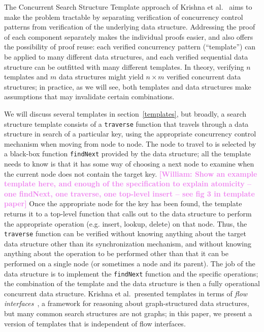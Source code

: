 \documentclass[a4paper,UKenglish,cleveref, autoref, thm-restate]{lipics-v2021}
\newcommand{\wm}[1]{\textbf{\textcolor{violet}{[William: #1]}}}
\begin{document}
The Concurrent Search Structure Template approach of Krishna et al.~\cite{templates} aims to make the problem tractable by separating verification of concurrency control patterns from verification of the underlying data structure. Addressing the proof of each component separately makes the individual proofs easier, and also offers the possibility of proof reuse: each verified concurrency pattern (``template'') can be applied to many different data structures, and each verified sequential data structure can be outfitted with many different templates. In theory, verifying $n$ templates and $m$ data structures might yield $n \times m$ verified concurrent data structures; in practice, as we will see, both templates and data structures make assumptions that may invalidate certain combinations. %

We will discuss several templates in section~\ref{templates}, but broadly, a search structure template consists of a \lstinline{traverse} function that travels through a data structure in search of a particular key, using the appropriate concurrency control mechanism when moving from node to node. The node to travel to is selected by a black-box function \lstinline{findNext} provided by the data structure; all the template needs to know is that it has some way of choosing a next node to examine when the current node does not contain the target key. \wm{Show an example template here, and enough of the specification to explain atomicity -- one findNext, one traverse, one top-level insert -- see fig 3 in template paper} Once the appropriate node for the key has been found, the template returns it to a top-level function that calls out to the data structure to perform the appropriate operation (e.g. insert, lookup, delete) on that node. Thus, the \lstinline{traverse} function can be verified without knowing anything about the target data structure other than its synchronization mechanism, and without knowing anything about the operation to be performed other than that it can be performed on a single node (or sometimes a node and its parent). The job of the data structure is to implement the \lstinline{findNext} function and the specific operations; the combination of the template and the data structure is then a fully operational concurrent data structure. Krishna et al.~presented templates in terms of \emph{flow interfaces}~\cite{krishna2017flow}, a framework for reasoning about graph-structured data structures, but many common search structures are not graphs; in this paper, we present a version of templates that is independent of flow interfaces. %
\end{document}
